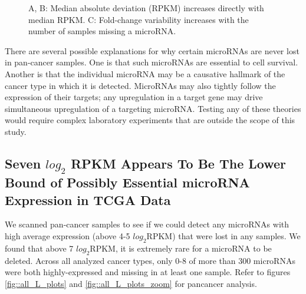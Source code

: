 \documentclass[12pt]{report}
\begin{document}
  \begin{figure}[H]
   \centering

    \caption{A, B: Median absolute deviation (RPKM) increases directly with median RPKM. C: Fold-change variability increases with the number of samples missing a microRNA.}
    \label{fig::mean_on_fig}
  \end{figure}

  There are several possible explanations for why certain microRNAs are never lost in pan-cancer samples. One is that such microRNAs are essential to cell
  survival. Another is that the individual microRNA may be a causative hallmark of the cancer type in which it is detected. MicroRNAs may also tightly follow the
  expression of their targets; any upregulation in a target gene may drive simultaneous upregulation of a targeting microRNA. Testing any of these theories would
  require complex laboratory experiments that are outside the scope of this study.
  
  
\subsection*{Seven $log_{2}$ RPKM Appears To Be The Lower Bound of Possibly Essential microRNA Expression in TCGA Data}
  We scanned pan-cancer samples to see if we could detect any microRNAs with high average expression (above 4-5 $log_{2} \text{RPKM}$) that were lost in any samples. We found that 
  above 7 $log_{2} \text{RPKM}$, it is extremely rare for a microRNA to be deleted. Across all analyzed cancer types, only 0-8 of more than 300 microRNAs were both highly-expressed and missing in at least one sample.
  Refer to figures \ref{fig::all_L_plots} and \ref{fig::all_L_plots_zoom} for pancancer analysis.
\end{document}
